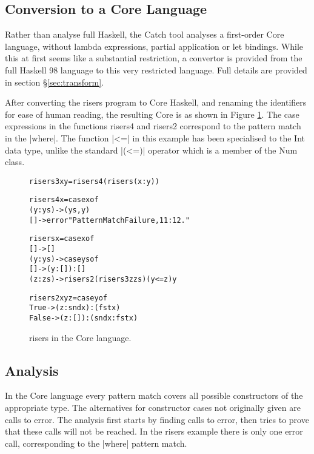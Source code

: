 \documentclass[preprint]{sigplanconf}
\newcommand{\C}[1]{\textsf{#1}}
\newenvironment{code}{\begin{alltt}\small}{\end{alltt}}
\begin{document}
\subsection{Conversion to a Core Language}

Rather than analyse full Haskell, the Catch tool analyses a first-order Core language, without lambda expressions, partial application or let bindings. While this at first seems like a substantial restriction, a convertor is provided from the full Haskell 98 language to this very restricted language. Full details are provided in section \S\ref{sec:transform}.

After converting the \C{risers} program to Core Haskell, and renaming the identifiers for ease of human reading, the resulting Core is as shown in Figure \ref{fig:risers_core}. The case expressions in the functions \C{risers4} and \C{risers2} correspond to the pattern match in the |where|. The function |<=| in this example has been specialised to the Int data type, unlike the standard |(<=)| operator which is a member of the \C{Num} class.

\begin{figure}
\begin{code}
risers3 x y = risers4 (risers (x : y))

risers4 x = case x of
    (y:ys) -> (ys, y)
    [] -> error "Pattern Match Failure, 11:12."

risers x = case x of
    [] -> []
    (y:ys) ->  case ys of
         [] -> (y : []) : []
         (z:zs) -> risers2 (risers3 z zs) (y <= z) y

risers2 x y z =  case y of
    True -> (z : snd x) : (fst x)
    False -> (z : []) : (snd x : fst x)
\end{code}
\caption{\C{risers} in the Core language.}
\label{fig:risers_core}
\end{figure}

\subsection{Analysis}

In the Core language every pattern match covers all possible constructors of the appropriate type. The alternatives for constructor cases not originally given are calls to \C{error}. The analysis first starts by finding calls to \C{error}, then tries to prove that these calls will not be reached. In the \C{risers} example there is only one \C{error} call, corresponding to the |where| pattern match.
\end{document}
